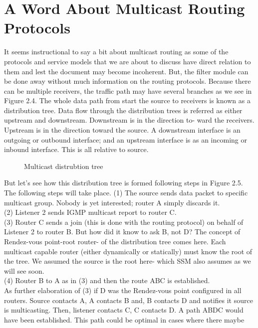 \documentclass[11pt,left=2cm,bottom=2cm,oneside]{book}
\begin{document}
\section{A Word About Multicast Routing Protocols}
It seems instructional to say a bit about multicast routing as some of the
protocols and service models that we are about to discuss have direct relation
to
them and lest the document may become incoherent. But, the filter module can
be
done away without much information on the routing protocols.
Because there can be multiple receivers, the traffic path may have several
branches as we see in Figure 2.4. The whole data path from start the source to
receivers is known as a distribution tree. Data flow through the distribution
trees
is referred as either upstream and downstream. Downstream is in the direction
to-
ward the receivers. Upstream is in the direction toward the source. A
downstream
interface is an outgoing or outbound interface; and an upstream interface is
as an
incoming or inbound interface. This is all relative to source.
\indent\begin{flushleft}\begin{figure}[H]\caption{Multicast distrubtion tree}\end{figure}\end{flushleft}
But let's see how this distribution tree is formed following steps in Figure
2.5.
The following steps will take place.
(1) The source sends data packet to specific multicast group. Nobody is yet
interested; router A simply discards it.\\
(2) Listener 2 sends IGMP multicast report to router C.\\
(3) Router C sends a join (this is done with the routing protocol) on behalf
of Listener 2 to router B. But how did it know to ask B, not D? The
concept of Rendez-vous point-root router- of the distribution tree comes
here. Each multicast capable router (either dynamically or statically)
must know the root of the tree. We assumed the source is the root here-
which SSM also assumes as we will see soon.\\
(4) Router B to A as in (3) and then the route ABC is established.\\
As further elaboration of (3) if D was the Rendez-vous point configured in all
routers. Source contacts A, A contacts B and, B contacts D and notifies it
source is
multicasting. Then, listener contacts C, C contacts D. A path ABDC would have
been established. This path could be optimal in cases where there maybe
\end{document}
